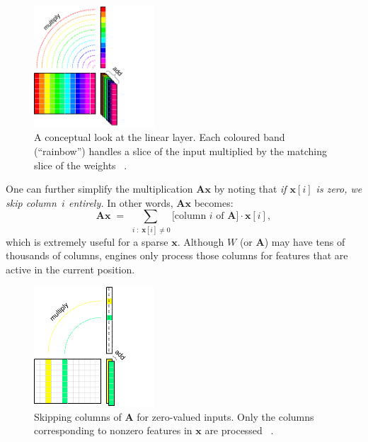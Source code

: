 \documentclass[12pt,a4paper]{article}
\begin{document}
\begin{figure}[H]
    \centering
    \includegraphics[width=0.4\textwidth]{figures/mv.pdf}
    \caption{A conceptual look at the linear layer. Each coloured band (“rainbow”) 
    handles a slice of the input multiplied by the matching slice of the weights ~\cite{githubdocs}.}
    \label{fig:mv}
\end{figure}
One can further simplify the multiplication \(\mathbf{A}\mathbf{x}\) by noting that
\emph{if \(\mathbf{x}[i]\) is zero, we skip column~\(i\) entirely.} 
In other words, \(\mathbf{A}\mathbf{x}\) becomes:
\[
\mathbf{A}\mathbf{x} \;=\; \sum_{\,i\;:\;\mathbf{x}[i]\neq0} 
   \bigl[\text{column } i\text{ of }\mathbf{A}\bigr] \cdot \mathbf{x}[i],
\]
which is extremely useful for a sparse \(\mathbf{x}\). 
Although \(W\) (or \(\mathbf{A}\)) may have tens of thousands of columns, 
engines only process those columns for features that are active in the current position.
\begin{figure}[H]
    \centering
    \includegraphics[width=0.4\textwidth]{figures/mvs.pdf}
    \caption{Skipping columns of \(\mathbf{A}\) for zero-valued inputs. 
    Only the columns corresponding to nonzero features in \(\mathbf{x}\) are processed ~\cite{githubdocs}.}
    \label{fig:skipcol}
\end{figure}
\end{document}
